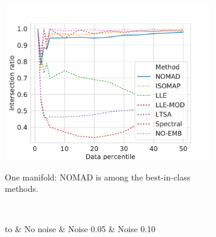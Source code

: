 \documentclass[twoside,11pt]{article}
\begin{document}
\begin{figure}
\begin{subfigure}{\textwidth}
\begin{footnotesize}
\begin{tabu}
		\includegraphics[width=\linewidth]{figures/geodesics/geodesics_teapot_orthogonal_noise010} \\
    \end{tabu}
    \end{footnotesize}
    \caption{One manifold: NOMAD is among the best-in-class methods.}
    \end{subfigure}
    \\
    \begin{subfigure}{\textwidth}
    \begin{footnotesize}
    \begin{tabu} to 
    	&
        No noise &
        Noise 0.05 &
        Noise 0.10 \\
        

\end{tabu}
\end{footnotesize}
\end{subfigure}
\end{figure}
\end{document}
